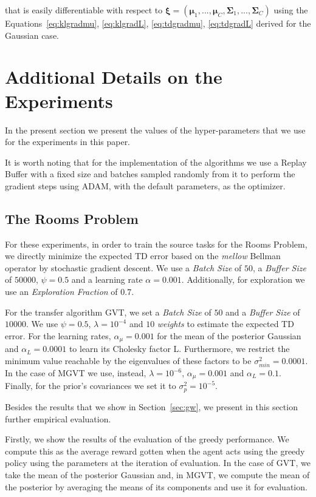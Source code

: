 \documentclass{article}
\begin{document}
that is easily differentiable with respect to $\bm{\xi} = (\bm{\mu}_1,..., \bm{\mu}_C, \bm{\Sigma}_1,..., \bm{\Sigma}_C)$ using the Equations~\eqref{eq:klgradmu}, \eqref{eq:klgradL}, \eqref{eq:tdgradmu}, \eqref{eq:tdgradL} derived for the Gaussian case.

\section{Additional Details on the Experiments}

In the present section we present the values of the hyper-parameters that we use for the experiments in this paper. 

It is worth noting that for the implementation of the algorithms we use a Replay Buffer with a fixed size and batches sampled randomly from it to perform the gradient steps using ADAM, with the default parameters, as the optimizer.

\subsection{The Rooms Problem}

For these experiments, in order to train the source tasks for the Rooms Problem, we directly minimize the expected TD error based on the \textit{mellow} Bellman operator by stochastic gradient descent. We use a \textit{Batch Size} of $50$, a \textit{Buffer Size} of $50000$, $\psi=0.5$ and a learning rate $\alpha=0.001$. Additionally, for exploration we use an \textit{Exploration Fraction} of $0.7$.

For the transfer algorithm GVT, we set a \textit{Batch Size} of $50$ and a \textit{Buffer Size} of $10000$. We use $\psi=0.5$, $\lambda=10^{-4}$ and $10$ \textit{weights} to estimate the expected TD error. For the learning rates, $\alpha_{\mu}=0.001$ for the mean of the posterior Gaussian and $\alpha_{L}=0.0001$ to learn its Cholesky factor L. Furthermore, we restrict the minimum value reachable by the eigenvalues of these factors to be $\sigma_{min}^2=0.0001$. In the case of MGVT we use, instead, $\lambda=10^{-6}$, $\alpha_{\mu}=0.001$ and $\alpha_{L}=0.1$. Finally, for the prior's covariances we set it to $\sigma_p^2=10^{-5}$.

Besides the results that we show in Section~\ref{sec:gw}, we present in this section further empirical evaluation.

Firstly, we show the results of the evaluation of the greedy performance. We compute this as the average reward gotten when the agent acts using the greedy policy using the parameters at the iteration of evaluation. In the case of GVT, we take the mean of the posterior Gaussian and, in MGVT, we compute the mean of the posterior by averaging the means of its components and use it for evaluation. 
\end{document}
